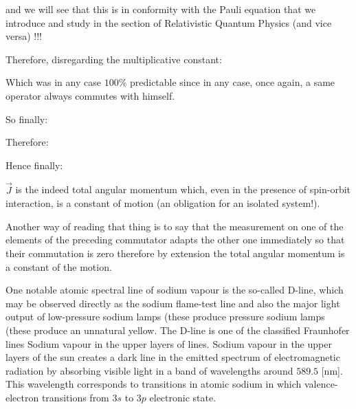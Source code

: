 	and we will see that this is in conformity with the Pauli equation that we introduce and study in the section of Relativistic Quantum Physics (and vice versa) !!!

	Therefore, disregarding the multiplicative constant:
	
	Which was in any case $100\%$ predictable since in any case, once again, a same operator always commutes with himself.

	So finally:	
	
	Therefore:
	
	Hence finally:
	
	$\vec{J}$ is the indeed total angular momentum which, even in the presence of spin-orbit interaction, is a constant of motion (an obligation for an isolated system!).
	\begin{tcolorbox}[title=Remark,colframe=black,arc=10pt]
	Another way of reading that thing is to say that the measurement on one of the elements of the preceding commutator adapts the other one immediately so that their commutation is zero therefore by extension the total angular momentum is a constant of the motion.
	\end{tcolorbox}
	One notable atomic spectral line of sodium vapour is the so-called D-line, which may be observed directly as the sodium flame-test line and also the major light output of low-pressure sodium lamps (these produce pressure sodium lamps (these produce an unnatural yellow. The D-line is one of the classified Fraunhofer lines Sodium vapour in the upper layers of lines. Sodium vapour in the upper layers of the sun creates a dark line in the emitted spectrum of electromagnetic radiation by absorbing visible light in a band of wavelengths around $589.5$ [nm]. This wavelength corresponds to transitions in atomic sodium in which valence-electron transitions from $3s$ to $3p$ electronic state.
	
